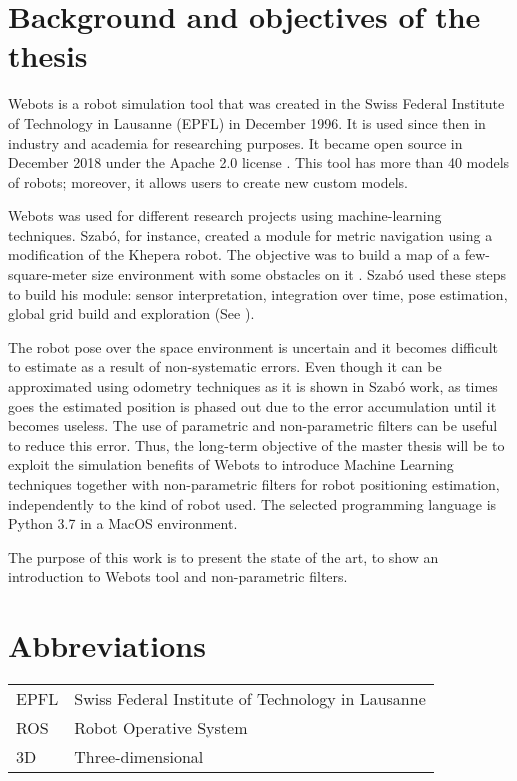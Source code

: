 \section{Background and objectives of the thesis}

Webots is a robot simulation tool that was created in the Swiss Federal Institute of Technology in Lausanne (EPFL) in December 1996. It is used since then in industry and academia for researching purposes. It became open source in December 2018 under the Apache 2.0 license \cite{cyberbotics}.  This tool has more than 40 models of robots; moreover, it allows users to create new custom models.


Webots was used for different research projects using machine-learning techniques. Szab\'{o}, for instance, created a module for metric navigation using a modification of the Khepera robot. The objective was to build a map of a few-square-meter size environment with some obstacles on it \cite{szabo}. Szab\'{o} used these steps to build his module: sensor interpretation, integration over time, pose estimation, global grid build and exploration (See \cite{thrun-1}).

The robot pose over the space environment is uncertain and it becomes difficult to estimate as a result of non-systematic errors. Even though it can be approximated using odometry techniques as it is shown in Szab\'{o} work, as times goes the estimated position is phased out due to the error accumulation until it becomes useless. The use of parametric and non-parametric filters can be useful to reduce this error. Thus, the long-term objective of the master thesis will be to exploit the simulation benefits of Webots to introduce Machine Learning techniques together with non-parametric filters for robot positioning estimation, independently to the kind of robot used. The selected programming language is Python 3.7 in a MacOS environment.

The purpose of this work is to present the state of the art, to show an introduction to Webots tool and non-parametric filters. 

\section{Abbreviations}
\begin{flushleft}
\begin{tabular}{l l}
EPFL & Swiss Federal Institute of Technology in Lausanne\\
ROS & Robot Operative System\\
3D & Three-dimensional\\
\end{tabular}
\end{flushleft}

